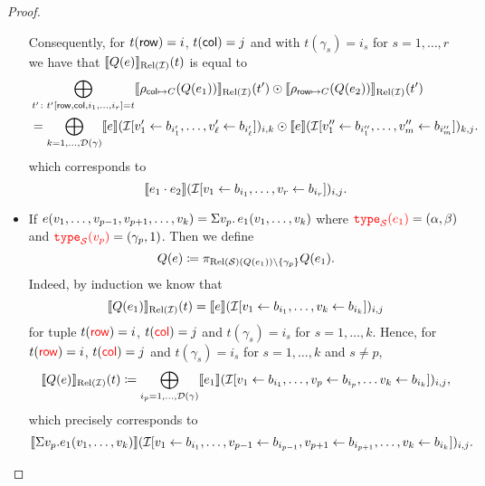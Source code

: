 \begin{proof}
\begin{itemize}
{		Consequently, for $t(\mathsf{row})=i$, $t(\mathsf{col})=j$ and with $t(\gamma_s)=i_s$ for $s=1,\ldots, r$ we have
		that $\llbracket Q(e) \rrbracket_{\text{Rel}(\mathcal{I})}(t)$ is equal to
		\begin{align*}
			&\bigoplus_{t'\colon t'[\mathsf{row},\mathsf{col},i_1,\ldots,i_r]=t} \llbracket \rho_{\mathsf{col}\mapsto C}(Q (e_1)) \rrbracket_{\text{Rel}(\mathcal{I})}(t')\odot \llbracket \rho_{\mathsf{row}\mapsto C}(Q (e_2)) \rrbracket_{\text{Rel}(\mathcal{I})}(t') \\
			&=\bigoplus_{k=1,\ldots,\mathcal{D}(\gamma)} \llbracket e \rrbracket(\mathcal{I}[v_1'\gets b_{i'_1},\ldots,v_\ell'\gets b_{i'_\ell}])_{i,k}\odot \llbracket e \rrbracket(\mathcal{I}[v_1''\gets b_{i''_1},\ldots,v_m''\gets b_{i''_m}])_{k,j}.
		\end{align*}
		which corresponds to 
		$$
		\llbracket e_1\cdot e_2 \rrbracket(\mathcal{I}[v_1\gets b_{i_1},\ldots,v_r\gets b_{i_r}])_{i,j}.
		$$
		}
  \item If $e(v_1,\ldots,v_{p-1},v_{p+1},\ldots,v_k)=\Sigma v_p. \, e_1(v_1,\ldots,v_k)$ where ${\color{red} \texttt{type}_{\mathcal{S}}(e_1)}=(\alpha,\beta)$ and ${\color{red} \texttt{type}_{\mathcal{S}}(v_p)}=(\gamma_p,1)$. Then we define
		$$
		Q (e)\coloneqq \pi_{\text{Rel}(\mathcal{S})(Q(e_1))\setminus\{\gamma_p\}} Q (e_1).
		$$
		Indeed, by induction we know that 
		$$
		\llbracket Q(e_1) \rrbracket_{\text{Rel}(\mathcal{I})}(t)=\llbracket e \rrbracket(\mathcal{I}[v_1\gets b_{i_1},\ldots,v_k\gets b_{i_k}])_{i,j}
		$$
		for tuple $t({\color{red} \mathsf{row}})=i$, $t({\color{red} \mathsf{col}})=j$ and $t(\gamma_s)=i_s$ for $s=1,\ldots, k$.
		Hence, for $t({\color{red} \mathsf{row}})=i$, $t({\color{red} \mathsf{col}})=j$ and $t(\gamma_s)=i_s$ for $s=1,\ldots, k$ and $s\neq p$,
		$$
		\llbracket Q(e) \rrbracket_{\text{Rel}(\mathcal{I})}(t)\coloneqq \bigoplus_{i_p=1,\ldots,\mathcal{D}(\gamma)} \llbracket e_1 \rrbracket(\mathcal{I}[v_1\gets b_{i_1},\ldots,v_{p}\gets b_{i_p},\ldots v_k\gets b_{i_k}])_{i,j},$$
		which precisely corresponds to 
		$$
		\llbracket \Sigma v_p. e_1(v_1,\ldots,v_k) \rrbracket(\mathcal{I}[v_1\gets b_{i_1},\ldots,v_{p-1}\gets b_{i_{p-1}},v_{p+1}\gets b_{i_{p+1}},\ldots,v_k\gets b_{i_k}])_{i,j}.
		$$

\end{itemize}
\end{proof}
